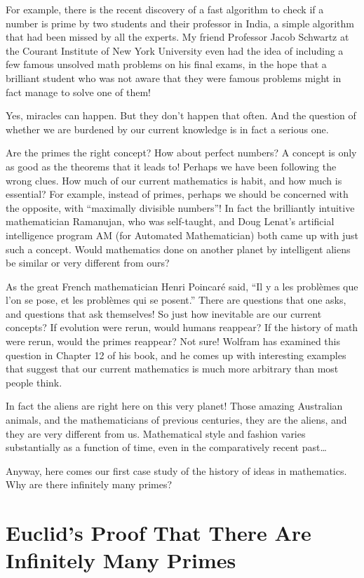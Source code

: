 \documentclass[12pt]{book}
\begin{document}
For example, there is the recent discovery of a fast algorithm to check if a number
is prime by two students and their professor in India, a simple algorithm 
that had been missed by all the experts.
My friend Professor Jacob Schwartz at the Courant Institute of New York University 
even had the idea of including a few famous unsolved
math problems on his final exams, 
in the hope that a brilliant student who was not aware that they were
famous problems might in fact manage to solve one of them!

Yes, miracles can happen. But they don't happen that often.
And the question of whether we are burdened by our current knowledge is in fact a serious one.

Are the primes the right concept? How about perfect numbers?
A concept is only as good as the theorems that it leads to!  Perhaps we have been
following the wrong clues.  
How much of our current mathematics is habit, and how much is essential?
For example, instead of primes, perhaps we should 
be concerned with the opposite, with ``maximally divisible numbers''! 
In fact the brilliantly intuitive mathematician Ramanujan, who was self-taught,
and Doug Lenat's artificial intelligence program AM (for Automated Mathematician)
both came up with just such a concept.
Would mathematics done on another planet by 
intelligent
aliens be similar or very different from ours?

As the great French mathematician Henri Poincar\'e said, 
``Il y a les probl\`emes que l'on se pose, et les probl\`emes qui se posent.''
There are
questions that one asks, and questions that ask themselves!  So just how inevitable are our 
current concepts?
If evolution were rerun, would humans reappear?  If the history of math were rerun, would
the primes reappear?  Not sure!
Wolfram has examined this question in Chapter 12 of his book, and he comes up with 
interesting examples that suggest that our
current mathematics is much more arbitrary than most people think.

In fact the aliens are right here on this very planet!  Those amazing Australian animals, and the
mathematicians of previous centuries, they are the aliens, and they are very different from us.
Mathematical style and fashion varies substantially as a function of time, even 
in the comparatively recent past\ldots

Anyway, here comes our first case study of the history of ideas in mathematics.
Why are there infinitely many primes?

\section*{Euclid's Proof That There Are Infinitely Many Primes}
\end{document}
